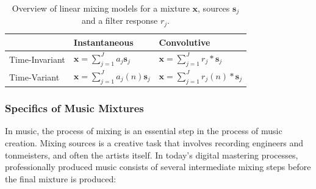 \begin{table}[]
    \centering
\begin{longtable}[]{lll}
\toprule
\begin{minipage}[b]{0.26\columnwidth}\raggedright
\strut
\end{minipage} & \begin{minipage}[b]{0.32\columnwidth}\raggedright
Instantaneous\strut
\end{minipage} & \begin{minipage}[b]{0.3\columnwidth}\raggedright
Convolutive\strut
\end{minipage}\tabularnewline
\midrule
\endhead
\begin{minipage}[t]{0.26\columnwidth}\raggedright
Time-Invariant\strut
\end{minipage} & \begin{minipage}[t]{0.32\columnwidth}\raggedright
\(\mathbf{x}=\sum_{j=1}^{J}a_j\mathbf{s}_j\)\strut
\end{minipage} & \begin{minipage}[t]{0.3\columnwidth}\raggedright
\(\mathbf{x} = \sum_{j=1}^{J}r_{j} \ast \mathbf{s}_j\)\strut
\end{minipage}\tabularnewline
\begin{minipage}[t]{0.26\columnwidth}\raggedright
Time-Variant\strut
\end{minipage} & \begin{minipage}[t]{0.32\columnwidth}\raggedright
\(\mathbf{x}=\sum_{j=1}^{J}a_j(n)\mathbf{s}_j\)\strut
\end{minipage} & \begin{minipage}[t]{0.3\columnwidth}\raggedright
\(\mathbf{x} = \sum_{j=1}^{J}r_{j}(n) \ast \mathbf{s}_j\)\strut
\end{minipage}\tabularnewline
\bottomrule
\end{longtable}
    \caption{Overview of linear mixing models for a mixture \(\mathbf{x}\), sources \(\mathbf{s}_j\) and a filter response \(r_j\).}
    \label{tab:mixing_models}
\end{table}

\subsubsection*{Specifics of Music Mixtures}
\label{par:specifics_of_music_mixtures}

In music, the process of mixing is an essential step in the process of music creation.
Mixing sources is a creative task that involves recording engineers and tonmeisters, and often the artists itself.
In today's digital mastering processes, professionally produced music consists of several intermediate mixing steps before the final mixture is produced:

